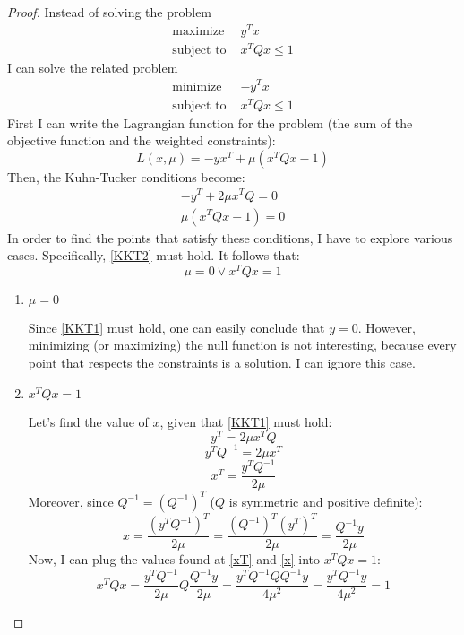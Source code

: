 \begin{proof}
    Instead of solving the problem
    \begin{align*}
        \text{maximize } & y^Tx \\
        \text{subject to } & x^TQx\leq 1
    \end{align*}
    I can solve the related problem
    \begin{align*}
        \text{minimize } & -y^Tx \\
        \text{subject to } & x^TQx\leq 1
    \end{align*}
    First I can write the Lagrangian function for the problem (the sum of the objective function and the weighted constraints):
    \[L(x,\mu) = -yx^T + \mu(x^TQx - 1)\]
    Then, the Kuhn-Tucker conditions become:
    \begin{gather}
        -y^T + 2\mu x^TQ = 0 \label{KKT1} \\
        \mu(x^TQx - 1) = 0 \label{KKT2}
    \end{gather}
    In order to find the points that satisfy these conditions, I have to explore various cases. Specifically, \eqref{KKT2} must hold. It follows that:
    \[\mu = 0 \lor x^TQx = 1\]
    \begin{enumerate}
        \item \(\mu = 0\)\par
        Since \eqref{KKT1} must hold, one can easily conclude that \(y = 0\). However, minimizing (or maximizing) the null function is not interesting, because every point that respects the constraints is a solution. I can ignore this case.
        \item \(x^TQx = 1\)\par
        Let's find the value of \(x\), given that \eqref{KKT1} must hold:
        \[y^T=2\mu x^TQ\]
        \[y^TQ^{-1}=2\mu x^T\]
        \begin{equation}\label{xT}
            x^T = \frac{y^TQ^{-1}}{2\mu}
        \end{equation}
        Moreover, since \(Q^{-1}=(Q^{-1})^T\) (\(Q\) is symmetric and positive definite):
        \begin{equation}\label{x}
            x = \frac{(y^TQ^{-1})^T}{2\mu} = \frac{(Q^{-1})^T(y^T)^T}{2\mu} = \frac{Q^{-1}y}{2\mu}
        \end{equation}
        Now, I can plug the values found at \eqref{xT} and \eqref{x} into \(x^TQx=1\):
        \[x^TQx = \frac{y^TQ^{-1}}{2\mu}Q\frac{Q^{-1}y}{2\mu} = \frac{y^TQ^{-1}QQ^{-1}y}{4\mu^2} = \frac{y^TQ^{-1}y}{4\mu^2} = 1\]

\end{enumerate}
\end{proof}
